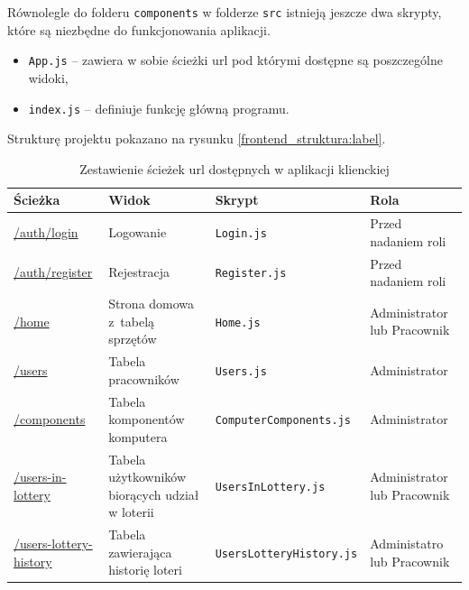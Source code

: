 Równolegle do folderu \texttt{components} w folderze \texttt{src} istnieją jeszcze dwa skrypty, które są niezbędne do funkcjonowania aplikacji.
\begin{itemize}
	\item \texttt{App.js} -- zawiera w sobie ścieżki url pod którymi dostępne są poszczególne widoki,
	\item \texttt{index.js} -- definiuje funkcję główną programu.
\end{itemize}

Strukturę projektu pokazano na rysunku \ref{frontend_struktura:label}.
\begin{table}[htb] \small
	\centering
\caption{Zestawienie ścieżek url dostępnych w aplikacji klienckiej}
\label{tab:zestawienie_widokow}
\begin{tabularx}{\linewidth}{|>{\footnotesize}l|X|>{\footnotesize}l|X|}
    \hline
    Ścieżka & Widok & Skrypt & Rola\\
    \hline \hline
    \url{/auth/login} & Logowanie &  \texttt{Login.js} & Przed nadaniem roli\\
    \hline
    \url{/auth/register} & Rejestracja & \texttt{Register.js} & Przed nadaniem roli\\
    \hline
    \url{/home} & Strona domowa z~tabelą sprzętów & \texttt{Home.js} & Administrator lub Pracownik\\
    \hline
    \url{/users} & Tabela pracowników & \texttt{Users.js} & Administrator\\
    \hline
		\url{/components} & Tabela komponentów komputera& \texttt{ComputerComponents.js} & Administrator\\
    \hline
		\url{/users-in-lottery} & Tabela użytkowników biorących udział w loterii& \texttt{UsersInLottery.js} & Administrator lub Pracownik\\
    \hline
		\url{/users-lottery-history} & Tabela zawierająca historię loteri & \texttt{UsersLotteryHistory.js} & Administatro lub Pracownik\\
    \hline
\end{tabularx}
\end{table}


